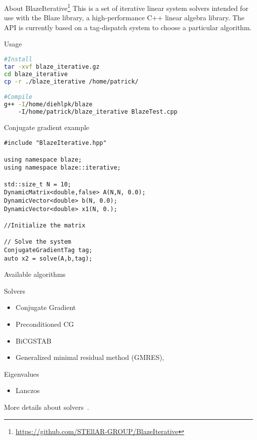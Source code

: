 \documentclass[12pt,t]{beamer}
\begin{document}
\begin{frame}[fragile]{About BlazeIterative\footnote{\tiny\url{https://github.com/STEllAR-GROUP/BlazeIterative}}}
This is a set of iterative linear system solvers intended for use with the Blaze library, a high-performance C++ linear algebra library. The API is currently based on a tag-dispatch system to choose a particular algorithm.

\begin{block}{Usage}
\begin{lstlisting}[language=bash]
#Install
tar -xvf blaze_iterative.gz
cd blaze_iterative
cp -r ./blaze_iterative /home/patrick/

#Compile
g++ -I/home/diehlpk/blaze 
    -I/home/patrick/blaze_iterative BlazeTest.cpp
\end{lstlisting}
\end{block}


\end{frame}

\begin{frame}[fragile]{Conjugate gradient example}
\begin{lstlisting}
#include "BlazeIterative.hpp"

using namespace blaze;
using namespace blaze::iterative;

std::size_t N = 10;
DynamicMatrix<double,false> A(N,N, 0.0);
DynamicVector<double> b(N, 0.0);
DynamicVector<double> x1(N, 0.);

//Initialize the matrix

// Solve the system
ConjugateGradientTag tag;
auto x2 = solve(A,b,tag);

\end{lstlisting}

\end{frame}

\begin{frame}{Available algorithms}

\begin{block}{Solvers}
\begin{itemize}
\item Conjugate Gradient
\item Preconditioned CG
\item BiCGSTAB
\item Generalized minimal residual method (GMRES),
\end{itemize}
\end{block}


\begin{block}{Eigenvalues}
\begin{itemize}
\item Lanczos
\end{itemize}
\end{block}
More details about solvers~\cite{barrett1994templates}.
\end{frame}
\end{document}
